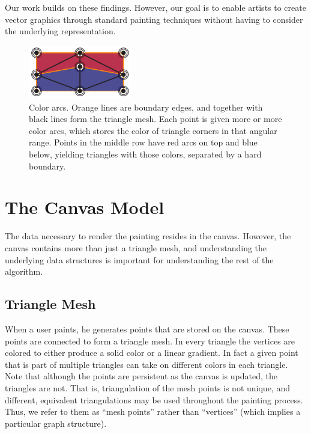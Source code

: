 \documentclass[review,draft]{acmsiggraph}
\begin{document}
Our work builds on these findings. However, our goal is to enable artists to create vector
graphics through standard painting techniques without having to consider the underlying representation.

\begin{figure}
    \centering
        \includegraphics[width=0.4\textwidth]{images/colorarcsfinal}
    \caption{Color arcs. Orange lines are boundary edges, and together with black lines form the triangle
    mesh. Each point is given more or more color arcs, 
    which stores the color of triangle corners in that angular range.
    Points in the middle row have red arcs on top and blue below,
    yielding triangles with those colors, separated by a hard boundary.}
    \label{fig:arcs}
\end{figure}

\section{The Canvas Model}
The data necessary to render the painting resides in the canvas. However, the canvas contains more than just
a triangle mesh, and understanding the underlying data structures is important for 
understanding the rest of the algorithm.

\subsection{Triangle Mesh}
When a user paints, he generates points that are stored on the canvas. These points are
connected to form a triangle mesh. In every triangle the vertices are colored to either
produce a solid color or a linear gradient. In fact a given point that is part of
multiple triangles can take on different colors in each triangle. Note that although
the points are persistent as the canvas is updated, the triangles are not.  
That is, triangulation of the mesh points is not unique, and different, equivalent triangulations may 
be used throughout the painting process.
Thus, we refer to them as ``mesh points'' rather than ``vertices'' (which implies a particular graph
structure).
\end{document}
